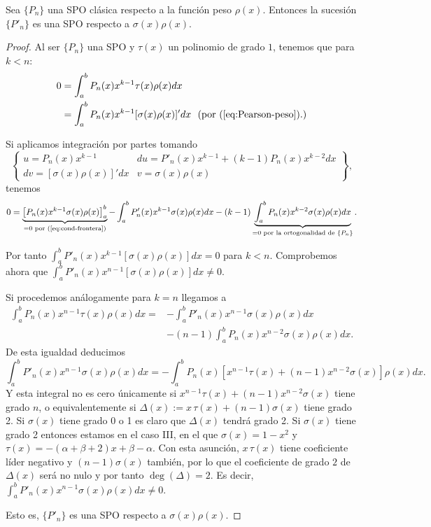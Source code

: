 \begin{teorema}
    Sea $\{P_n\}$ una SPO clásica respecto a la función peso $\rho(x)$. Entonces la sucesión $\{P'_n\}$ es una SPO respecto a $\sigma(x)\rho(x)$.
\end{teorema}
\begin{proof}
    Al ser $\{P_n\}$ una SPO y $\tau(x)$ un polinomio de grado $1$, tenemos que para $k<n$:
    \begin{equation*}
        \begin{split}
            0 &= \int_a^b P_n(x)x^{k-1}\tau(x)\rho(x)dx \\
            &= \int_a^b P_n(x)x^{k-1}[\sigma(x)\rho(x)]'dx \ \ \text{(por (\ref{eq:Pearson-peso}).)}
        \end{split}
    \end{equation*}

    Si aplicamos integración por partes tomando $$\left\{\begin{array}{ll}
       u=P_n(x)x^{k-1} & du = P'_n(x)x^{k-1} + (k-1)P_n(x)x^{k-2}dx\\
       dv =  [\sigma(x)\rho(x)]'dx  & v=\sigma(x)\rho(x)
    \end{array}\right\},$$ tenemos
    \begin{equation*}
        0 = \underbrace{\left[P_n(x)x^{k-1}\sigma(x)\rho(x)\right]_a^b}_{=0 \text{ por (\ref{eq:cond-frontera})}} - \int_a^b P'_n(x)x^{k-1}\sigma(x)\rho(x)dx - (k-1)\underbrace{\int_a^b P_n(x)x^{k-2}\sigma(x)\rho(x)dx}_{=0 \text{ por la ortogonalidad de } \{P_n\}}.
    \end{equation*}

    Por tanto $\int_a^b P'_n(x)x^{k-1}[\sigma(x)\rho(x)]dx=0$ para $k<n$. Comprobemos ahora que $\int_a^b P'_n(x)x^{n-1}[\sigma(x)\rho(x)]dx\neq0$.

    Si procedemos análogamente para $k=n$ llegamos a
    \begin{equation*}
        \begin{split}
            \int_a^b P_n(x)x^{n-1}\tau(x)\rho(x)dx = &- \int_a^b P'_n(x)x^{n-1}\sigma(x)\rho(x)dx\\ & - (n-1)\int_a^b P_n(x)x^{n-2}\sigma(x)\rho(x)dx.
        \end{split}
    \end{equation*}
    De esta igualdad deducimos
    $$
    \int_a^b P'_n(x)x^{n-1}\sigma(x)\rho(x)dx = - \int_a^b P_n(x)[x^{n-1}\tau(x) + (n-1)x^{n-2}\sigma(x)]\rho(x)dx.
    $$
    Y esta integral no es cero únicamente si $x^{n-1}\tau(x) + (n-1)x^{n-2}\sigma(x)$ tiene grado $n$, o equivalentemente si $\Delta(x):=x\,\tau(x) + (n-1)\sigma(x)$ tiene grado 2. Si $\sigma(x)$ tiene grado 0 o 1 es claro que $\Delta(x)$ tendrá grado 2. Si $\sigma(x)$ tiene grado 2 entonces estamos en el caso III, en el que $\sigma(x)=1-x^2$ y $\tau(x)=-(\alpha+\beta+2)x+\beta -\alpha$. Con esta asunción, $x\,\tau(x)$ tiene coeficiente líder negativo y $(n-1)\sigma(x)$ también, por lo que el coeficiente de grado $2$ de $\Delta(x)$ será no nulo y por tanto $\deg(\Delta)=2$. Es decir, $\int_a^b P'_n(x)x^{n-1}\sigma(x)\rho(x)dx \neq 0$.
    
    Esto es, $\{P'_n\}$ es una SPO respecto a $\sigma(x)\rho(x)$.
\end{proof}

